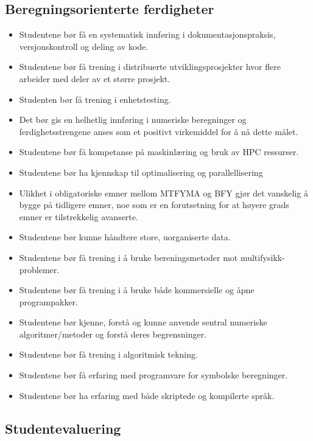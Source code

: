 \subsection{Beregningsorienterte ferdigheter}

\begin{itemize}
	\item Studentene bør få en systematisk innføring i dokumentasjonspraksis, versjonskontroll og deling av kode.
	\item Studentene bør få trening i distribuerte utviklingsprosjekter hvor flere arbeider med deler av et større prosjekt.
	\item Studenten bør få trening i enhetstesting.
	\item Det bør gis en helhetlig innføring i numeriske beregninger og ferdighetsstrengene anses som et positivt virkemiddel for å nå dette målet.
	\item Studentene bør få kompetanse på maskinlæring og bruk av HPC ressurser.
	\item Studentene bør ha kjennskap til optimalisering og parallellisering
	\item Ulikhet i obligatoriske emner mellom MTFYMA og BFY gjør det vanskelig å bygge på tidligere emner, noe som er en forutsetning for at høyere grads emner er tilstrekkelig avanserte.
	\item Studentene bør kunne håndtere store, uorganiserte data.
	\item Studentene bør få trening i å bruke bereningsmetoder mot multifysikk-problemer.
	\item Studentene bør få trening i å bruke både kommersielle og åpne programpakker.
	\item Studentene bør kjenne, forstå og kunne anvende sentral numeriske algoritmer/metoder og forstå deres begrensninger.
	\item Studentene bør få trening i algoritmisk tekning.
	\item Studentene bør få erfaring med programvare for symbolske beregninger.
	\item Studentene bør ha erfaring med både skriptede og kompilerte språk.
\end{itemize}

\subsection{Studentevaluering}

